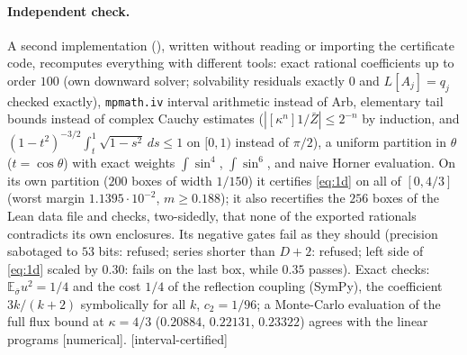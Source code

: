 \documentclass[11pt,a4paper]{article}
\theoremstyle{remark}
\theoremstyle{definition}
\newcommand{\E}{\mathbb{E}}
\newcommand{\st}[1]{\textsf{[#1]}}
\newcommand{\Zb}{\bar Z}
\begin{document}
\paragraph{Independent check.} A second implementation (), written without
reading or importing the certificate code, recomputes everything with different tools: exact rational
coefficients up to order $100$ (own downward solver; solvability residuals exactly $0$ and $L[A_j]=q_j$ checked
exactly), \texttt{mpmath.iv} interval arithmetic instead of Arb, elementary tail bounds instead of complex Cauchy
estimates ($|[\kappa^n]1/\Zb|\le2^{-n}$ by induction, and $(1-t^2)^{-3/2}\int_t^1\sqrt{1-s^2}\,ds\le1$ on $[0,1)$ instead of
$\pi/2$), a uniform partition in $\theta$ ($t=\cos\theta$) with exact weights $\int\sin^4$, $\int\sin^6$, and naive
Horner evaluation. On its own partition ($200$ boxes of width $1/150$) it certifies \eqref{eq:1d} on all of
$[0,4/3]$ (worst margin $1.1395\cdot10^{-2}$, $m\ge0.188$); it also recertifies the $256$ boxes of the Lean data
file and checks, two-sidedly, that none of the exported rationals contradicts its own enclosures. Its negative
gates fail as they should (precision sabotaged to $53$ bits: refused; series shorter than $D+2$: refused; left
side of \eqref{eq:1d} scaled by $0.30$: fails on the last box, while $0.35$ passes).
Exact checks: $\E_{\bar\sigma}u^2=1/4$ and the cost $1/4$ of the reflection coupling (SymPy), the coefficient
$3k/(k+2)$ symbolically for all $k$, $c_2=1/96$; a Monte-Carlo evaluation of the full flux bound at $\kappa=4/3$
($0.20884$, $0.22131$, $0.23322$) agrees with the linear programs \st{numerical}. \st{interval-certified}
\end{document}
